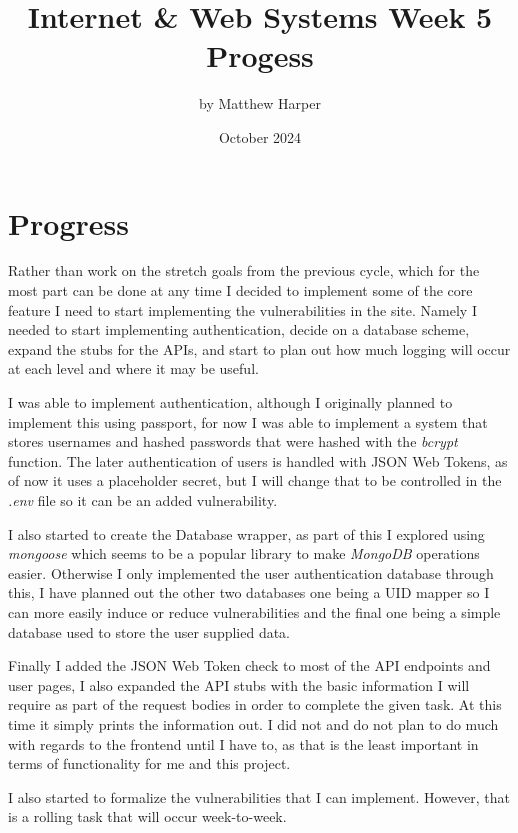 \documentclass{article}
\title{Internet \& Web Systems Week 5 Progess}
\author{by Matthew Harper }
\date{October 2024}
\begin{document}
\maketitle
\section{Progress}
Rather than work on the stretch goals from the previous cycle, which for the most part can be done at any time I decided to implement some of the
core feature I need to start implementing the vulnerabilities in the site. Namely I needed to start implementing authentication, decide on a database
scheme, expand the stubs for the APIs, and start to plan out how much logging will occur at each level and where it may be useful.

I was able to implement authentication, although I originally planned to implement this using passport, for now I was able to implement a system that stores
usernames and hashed passwords that were hashed with the \textit{bcrypt} function. The later authentication of users is handled with JSON Web Tokens, as of
now it uses a placeholder secret, but I will change that to be controlled in the \textit{.env} file so it can be an added vulnerability.

I also started to create the Database wrapper, as part of this I explored using \textit{mongoose} which seems to be a popular library to make \textit{MongoDB}
operations easier. Otherwise I only implemented the user authentication database through this, I have planned out the other two databases one being a UID
mapper so I can more easily induce or reduce vulnerabilities and the final one being a simple database used to store the user supplied data.

Finally I added the JSON Web Token check to most of the API endpoints and user pages, I also expanded the API stubs with the basic information I will require
as part of the request bodies in order to complete the given task. At this time it simply prints the information out. I did not and do not plan to do much
with regards to the frontend until I have to, as that is the least important in terms of functionality for me and this project.

I also started to formalize the vulnerabilities that I can implement. However, that is a rolling task that will occur week-to-week.
\end{document}
